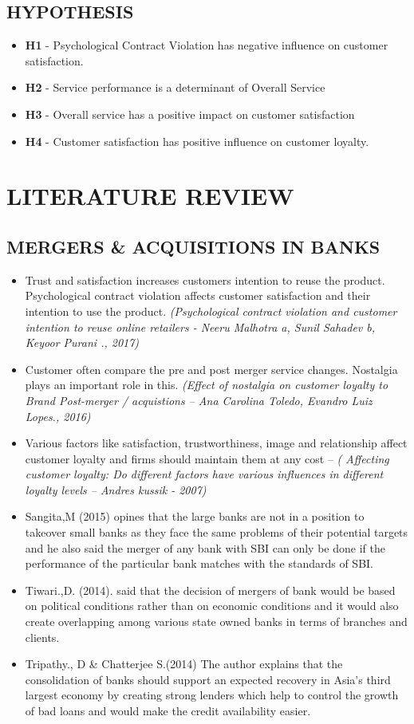 \documentclass[a4paper, 12pt]{extarticle}
\begin{document}
{\subsection{HYPOTHESIS}
\begin{itemize}
\item \textbf{H1} - Psychological Contract Violation has negative influence on customer satisfaction.
\item \textbf{H2} - Service performance is a determinant of Overall Service
\item \textbf{H3} - Overall service has a positive impact on customer satisfaction
\item \textbf{H4} - Customer satisfaction has positive influence on customer loyalty.
\end{itemize}

\newpage
\section{LITERATURE REVIEW}
\subsection{MERGERS \& ACQUISITIONS IN BANKS}
\begin{itemize}
\item Trust and satisfaction increases customers intention to reuse the product. Psychological contract violation affects customer satisfaction and their intention to use the product. \emph{(Psychological contract violation and customer intention to reuse online retailers - Neeru Malhotra a, Sunil Sahadev b, Keyoor Purani ., 2017)}
\item Customer often compare the pre and post merger service changes. Nostalgia plays an important role in this. \emph{(Effect of nostalgia on customer loyalty to Brand Post-merger / acquistions – Ana Carolina Toledo, Evandro Luiz Lopes., 2016)}
\item Various factors like satisfaction, trustworthiness, image and relationship affect customer loyalty and firms should maintain them at any cost – \emph{( Affecting customer loyalty: Do different factors have various influences in different loyalty levels – Andres kussik  - 2007)}
\item Sangita,M (2015) opines that the large banks are not in a position to takeover small banks as they face the same problems of their potential targets and he also said the merger of any bank with SBI can only be done if the performance of the particular bank matches with the standards of SBI. 
\item Tiwari.,D. (2014). said that the decision of mergers of bank would be based on political conditions rather than on economic conditions and it would also create overlapping among various state owned banks in terms of branches and clients.
\item Tripathy., D \& Chatterjee S.(2014) The author explains that the consolidation of banks should support an expected recovery in Asia's third largest economy by creating strong lenders which help to control the growth of bad loans and would make the credit availability easier. 
\end{itemize}
}
\end{document}
